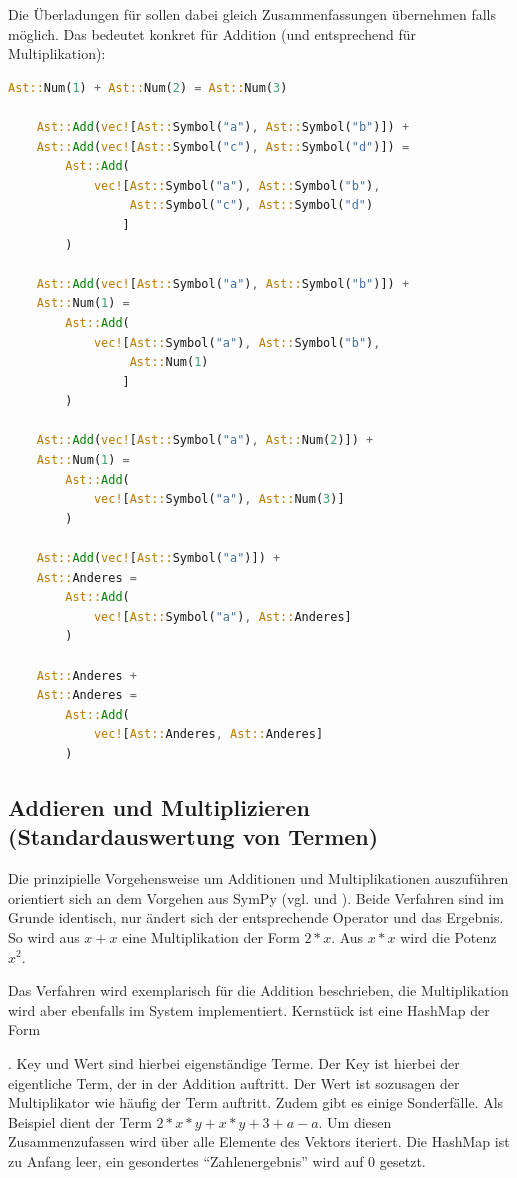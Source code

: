 \documentclass[11pt,a4paper, ngerman]{article}
\begin{document}
Die Überladungen für  sollen dabei gleich Zusammenfassungen übernehmen falls möglich. Das bedeutet konkret für Addition (und entsprechend für Multiplikation):

\begin{lstlisting}[language=rust, caption={smarte Operatenüberladung}]
    Ast::Num(1) + Ast::Num(2) = Ast::Num(3)

    Ast::Add(vec![Ast::Symbol("a"), Ast::Symbol("b")]) +
    Ast::Add(vec![Ast::Symbol("c"), Ast::Symbol("d")]) = 
        Ast::Add(
            vec![Ast::Symbol("a"), Ast::Symbol("b"), 
                 Ast::Symbol("c"), Ast::Symbol("d")
                ]
        )

    Ast::Add(vec![Ast::Symbol("a"), Ast::Symbol("b")]) +
    Ast::Num(1) =
        Ast::Add(
            vec![Ast::Symbol("a"), Ast::Symbol("b"), 
                 Ast::Num(1)
                ]
        )

    Ast::Add(vec![Ast::Symbol("a"), Ast::Num(2)]) +
    Ast::Num(1) =
        Ast::Add(
            vec![Ast::Symbol("a"), Ast::Num(3)]
        )

    Ast::Add(vec![Ast::Symbol("a")]) +
    Ast::Anderes =
        Ast::Add(
            vec![Ast::Symbol("a"), Ast::Anderes]
        )

    Ast::Anderes +
    Ast::Anderes =
        Ast::Add(
            vec![Ast::Anderes, Ast::Anderes]
        )
\end{lstlisting}

\label{sec:kapAddnundMult}
\subsection{Addieren und Multiplizieren (Standardauswertung von Termen)}
Die prinzipielle Vorgehensweise um Additionen und Multiplikationen auszuführen orientiert sich an dem Vorgehen aus SymPy (vgl. \cite{SymPyAddFlatten} und \cite{SymPyMulFlatten}). Beide Verfahren sind im Grunde identisch, nur ändert sich der entsprechende Operator und das Ergebnis. So wird aus $x+x$ eine Multiplikation der Form $2*x$. Aus $x*x$ wird die Potenz $x^2$. 

Das Verfahren wird exemplarisch für die Addition beschrieben, die Multiplikation wird aber ebenfalls im System implementiert. Kernstück ist eine HashMap der Form

. Key und Wert sind hierbei eigenständige Terme. Der Key ist hierbei der eigentliche Term, der in der Addition auftritt. Der Wert ist sozusagen der Multiplikator wie häufig der Term auftritt. Zudem gibt es einige Sonderfälle. Als Beispiel dient der Term 
$2*x*y + x*y + 3 + a - a$. Um diesen Zusammenzufassen wird über alle Elemente des Vektors iteriert. Die HashMap ist zu Anfang leer, ein gesondertes ``Zahlenergebnis'' wird auf 0 gesetzt.
\end{document}
